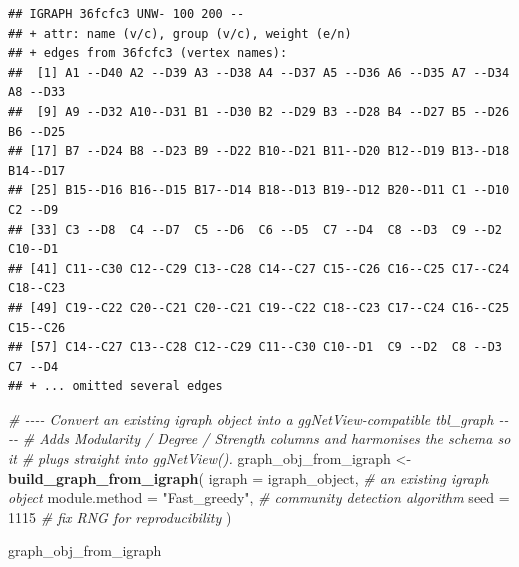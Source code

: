 \documentclass[
]{book}
\newenvironment{Shaded}{\begin{snugshade}}{\end{snugshade}}
\newcommand{\AttributeTok}[1]{\textcolor[rgb]{0.13,0.29,0.53}{#1}}
\newcommand{\CommentTok}[1]{\textcolor[rgb]{0.56,0.35,0.01}{\textit{#1}}}
\newcommand{\DecValTok}[1]{\textcolor[rgb]{0.00,0.00,0.81}{#1}}
\newcommand{\FunctionTok}[1]{\textcolor[rgb]{0.13,0.29,0.53}{\textbf{#1}}}
\newcommand{\NormalTok}[1]{#1}
\newcommand{\OtherTok}[1]{\textcolor[rgb]{0.56,0.35,0.01}{#1}}
\newcommand{\StringTok}[1]{\textcolor[rgb]{0.31,0.60,0.02}{#1}}
\begin{document}
\begin{verbatim}
## IGRAPH 36fcfc3 UNW- 100 200 -- 
## + attr: name (v/c), group (v/c), weight (e/n)
## + edges from 36fcfc3 (vertex names):
##  [1] A1 --D40 A2 --D39 A3 --D38 A4 --D37 A5 --D36 A6 --D35 A7 --D34 A8 --D33
##  [9] A9 --D32 A10--D31 B1 --D30 B2 --D29 B3 --D28 B4 --D27 B5 --D26 B6 --D25
## [17] B7 --D24 B8 --D23 B9 --D22 B10--D21 B11--D20 B12--D19 B13--D18 B14--D17
## [25] B15--D16 B16--D15 B17--D14 B18--D13 B19--D12 B20--D11 C1 --D10 C2 --D9 
## [33] C3 --D8  C4 --D7  C5 --D6  C6 --D5  C7 --D4  C8 --D3  C9 --D2  C10--D1 
## [41] C11--C30 C12--C29 C13--C28 C14--C27 C15--C26 C16--C25 C17--C24 C18--C23
## [49] C19--C22 C20--C21 C20--C21 C19--C22 C18--C23 C17--C24 C16--C25 C15--C26
## [57] C14--C27 C13--C28 C12--C29 C11--C30 C10--D1  C9 --D2  C8 --D3  C7 --D4 
## + ... omitted several edges
\end{verbatim}

\begin{Shaded}
\begin{Highlighting}[]
\CommentTok{\# {-}{-}{-}{-} Convert an existing igraph object into a ggNetView{-}compatible tbl\_graph {-}{-}{-}{-}}
\CommentTok{\# Adds Modularity / Degree / Strength columns and harmonises the schema so it}
\CommentTok{\# plugs straight into ggNetView().}
\NormalTok{graph\_obj\_from\_igraph }\OtherTok{\textless{}{-}} \FunctionTok{build\_graph\_from\_igraph}\NormalTok{(}
  \AttributeTok{igraph        =}\NormalTok{ igraph\_object,   }\CommentTok{\# an existing igraph object}
  \AttributeTok{module.method =} \StringTok{"Fast\_greedy"}\NormalTok{,   }\CommentTok{\# community detection algorithm}
  \AttributeTok{seed          =} \DecValTok{1115}             \CommentTok{\# fix RNG for reproducibility}
\NormalTok{)}

\NormalTok{graph\_obj\_from\_igraph}
\end{Highlighting}
\end{Shaded}
\end{document}
